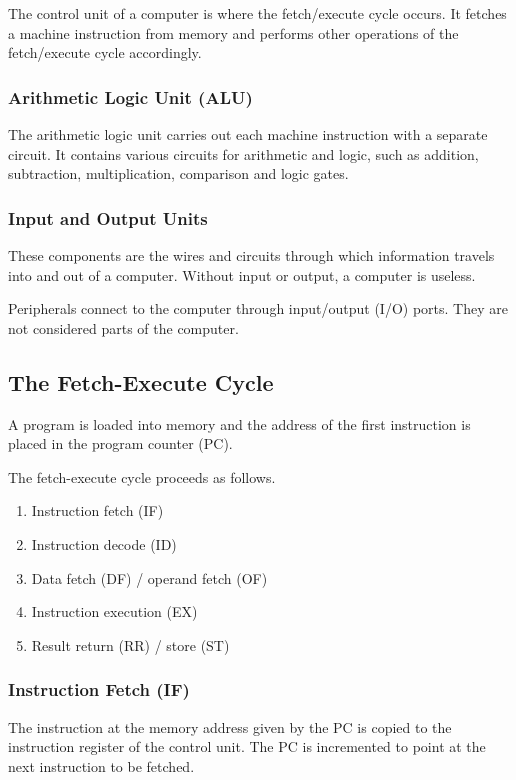 The control unit of a computer is where the fetch/execute cycle occurs.
It fetches a machine instruction from memory and performs other operations of the fetch/execute cycle accordingly.

\subsubsection{Arithmetic Logic Unit (ALU)}

The arithmetic logic unit carries out each machine instruction with a separate circuit.
It contains various circuits for arithmetic and logic, such as addition, subtraction, multiplication, comparison and logic gates.

\subsubsection{Input and Output Units}

These components are the wires and circuits through which information travels into and out of a computer.
Without input or output, a computer is useless.

Peripherals connect to the computer through input/output (I/O) ports.
They are not considered parts of the computer.

\subsection{The Fetch-Execute Cycle}

A program is loaded into memory and the address of the first instruction is placed in the program counter (PC).

The fetch-execute cycle proceeds as follows.
\begin{enumerate}
  \item Instruction fetch (IF)
  \item Instruction decode (ID)
  \item Data fetch (DF) / operand fetch (OF)
  \item Instruction execution (EX)
  \item Result return (RR) / store (ST)
\end{enumerate}

\subsubsection{Instruction Fetch (IF)}

The instruction at the memory address given by the PC is copied to the instruction register of the control unit.
The PC is incremented to point at the next instruction to be fetched.

